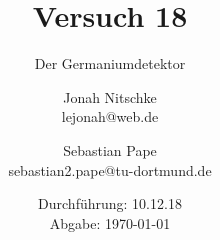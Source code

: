 

\title{Versuch 18}
\subtitle{Der Germaniumdetektor}
\author{Jonah Nitschke\\
        lejonah@web.de \and
        Sebastian Pape\\
        sebastian2.pape@tu-dortmund.de}
\date{Durchführung: 10.12.18\\
      Abgabe: \today}



\maketitle
\newpage
\setcounter{page}{1}

%
\newpage


\printbibliography


